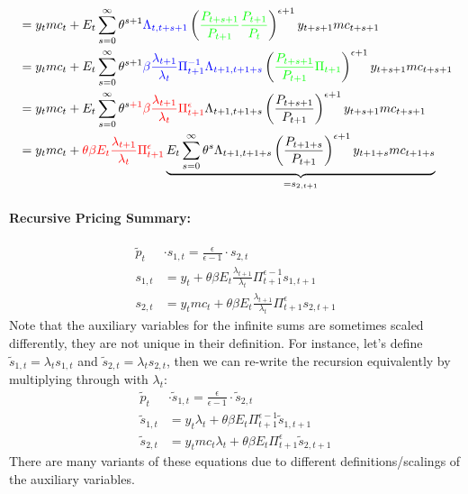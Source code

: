 \begin{enumerate}
\begin{align*}
&= y_t mc_t + E_t\sum^{\infty}_{s=0}\theta^{s+1} {\color{blue}{\Lambda_{t,t+s+1}}} \left({\color{green}{\frac{P_{t+s+1}}{P_{t+1}}\frac{P_{t+1}}{P_{t}}}}\right)^{\epsilon+1} y_{t+s+1} mc_{t+s+1}
\\
&= y_t mc_t + E_t\sum^{\infty}_{s=0}\theta^{s+1} {\color{blue}{\beta \frac{\lambda_{t+1}}{\lambda_t}\Pi_{t+1}^{-1}\Lambda_{t+1,t+1+s}}} \left({\color{green}{\frac{P_{t+s+1}}{P_{t+1}}\Pi_{t+1}}}\right)^{\epsilon+1} y_{t+s+1} mc_{t+s+1}
\\
&= y_t mc_t + E_t\sum^{\infty}_{s=0}\theta^{s{\color{red}+1}} {\color{red}\beta \frac{\lambda_{t+1}}{\lambda_t}\Pi_{t+1}^{\epsilon}} \Lambda_{t+1,t+1+s} \left(\frac{P_{t+s+1}}{P_{t+1}}\right)^{\epsilon+1} y_{t+s+1} mc_{t+s+1}
\\
&= y_t mc_t + 
{\color{red}\theta\beta E_t\frac{\lambda_{t+1}}{\lambda_t}\Pi_{t+1}^{\epsilon}} \underbrace{E_t\sum^{\infty}_{s=0}\theta^{s} \Lambda_{t+1,t+1+s} \left(\frac{P_{t+1+s}}{P_{t+1}}\right)^{\epsilon+1} y_{t+1+s} mc_{t+1+s}}_{=s_{2,t+1}}
\end{align*}
\paragraph{Recursive Pricing Summary:}
\begin{align*}
\widetilde{p}_t &\cdot s_{1,t} = \frac{\epsilon}{\epsilon-1} \cdot s_{2,t}\\
s_{1,t} &= y_t + \theta \beta E_t \frac{\lambda_{t+1}}{\lambda_{t}} \Pi_{t+1}^{\epsilon-1} s_{1,t+1}\\
s_{2,t} &= y_t mc_t + \theta \beta E_t \frac{\lambda_{t+1}}{\lambda_{t}} \Pi_{t+1}^{\epsilon} s_{2,t+1}
\end{align*}
Note that the auxiliary variables for the infinite sums are sometimes scaled differently, they are not unique in their definition.
For instance, let's define $\widetilde{s}_{1,t}= \lambda_t s_{1,t}$ and $\widetilde{s}_{2,t}=\lambda_t s_{2,t}$,
  then we can re-write the recursion equivalently by multiplying through with $\lambda_t$:
\begin{align*}
\widetilde{p}_t &\cdot \widetilde{s}_{1,t} = \frac{\epsilon}{\epsilon-1} \cdot \widetilde{s}_{2,t}\\
\widetilde{s}_{1,t} &= y_t \lambda_t + \theta \beta E_t \Pi_{t+1}^{\epsilon-1} \widetilde{s}_{1,t+1}\\
\widetilde{s}_{2,t} &= y_t mc_t \lambda_t + \theta \beta E_t \Pi_{t+1}^{\epsilon} \widetilde{s}_{2,t+1}
\end{align*}
There are many variants of these equations due to different definitions/scalings of the auxiliary variables.
		

\end{enumerate}
